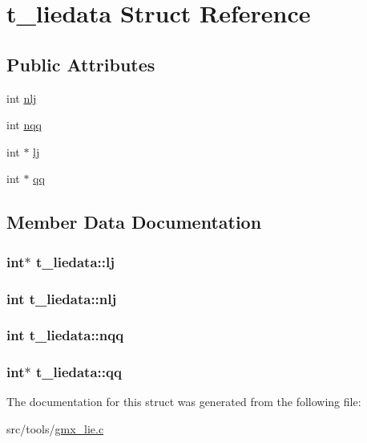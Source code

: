 \hypertarget{structt__liedata}{\section{t\-\_\-liedata \-Struct \-Reference}
\label{structt__liedata}
}
\subsection*{\-Public \-Attributes}
\begin{DoxyCompactItemize}
\item 
int \hyperlink{structt__liedata_a86dbe8595a242c4cea98f587df1acf08}{nlj}
\item 
int \hyperlink{structt__liedata_adaddefac13b2dd705f1b72a8cb9e2008}{nqq}
\item 
int $\ast$ \hyperlink{structt__liedata_adbb01cdcf9a0e4d0c988c6d3141a729c}{lj}
\item 
int $\ast$ \hyperlink{structt__liedata_af39939fb2d23beb54c5f713243ecec57}{qq}
\end{DoxyCompactItemize}


\subsection{\-Member \-Data \-Documentation}
\hypertarget{structt__liedata_adbb01cdcf9a0e4d0c988c6d3141a729c}{
\subsubsection[{lj}]{\setlength{\rightskip}{0pt plus 5cm}int$\ast$ {\bf t\-\_\-liedata\-::lj}}}\label{structt__liedata_adbb01cdcf9a0e4d0c988c6d3141a729c}
\hypertarget{structt__liedata_a86dbe8595a242c4cea98f587df1acf08}{
\subsubsection[{nlj}]{\setlength{\rightskip}{0pt plus 5cm}int {\bf t\-\_\-liedata\-::nlj}}}\label{structt__liedata_a86dbe8595a242c4cea98f587df1acf08}
\hypertarget{structt__liedata_adaddefac13b2dd705f1b72a8cb9e2008}{
\subsubsection[{nqq}]{\setlength{\rightskip}{0pt plus 5cm}int {\bf t\-\_\-liedata\-::nqq}}}\label{structt__liedata_adaddefac13b2dd705f1b72a8cb9e2008}
\hypertarget{structt__liedata_af39939fb2d23beb54c5f713243ecec57}{
\subsubsection[{qq}]{\setlength{\rightskip}{0pt plus 5cm}int$\ast$ {\bf t\-\_\-liedata\-::qq}}}\label{structt__liedata_af39939fb2d23beb54c5f713243ecec57}


\-The documentation for this struct was generated from the following file\-:\begin{DoxyCompactItemize}
\item 
src/tools/\hyperlink{gmx__lie_8c}{gmx\-\_\-lie.\-c}\end{DoxyCompactItemize}
